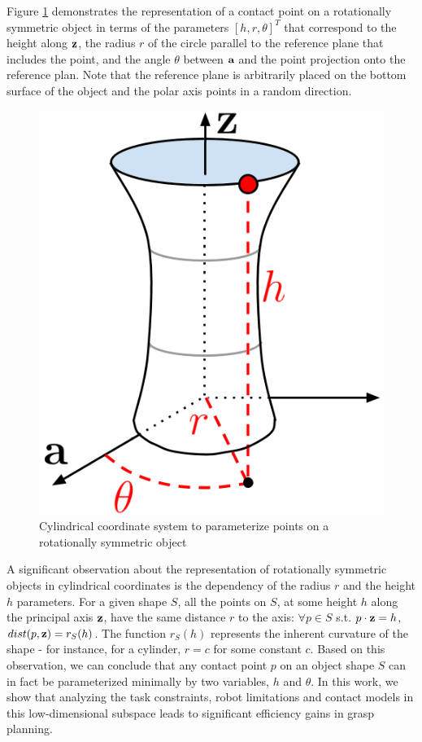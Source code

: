 \documentclass{aamas2015}
\begin{document}
Figure \ref{fig:representation} demonstrates the representation
of a contact point on a rotationally symmetric object in terms of the parameters $[h, r, \theta]^T$
that correspond to the height along $\textbf{z}$, the radius $r$ of the circle parallel to the
reference plane that includes the point, and the angle $\theta$ between $\textbf{a}$ and the point
projection onto the reference plan. Note that the reference plane is arbitrarily placed 
on the bottom surface of the object and the polar axis points in a random
direction. 

\begin{figure}[ht!]
  \begin{center}
    \includegraphics[width=0.75\linewidth]{./images/representation.png} \quad 
  \end{center}
  \caption{Cylindrical coordinate system to parameterize points on a rotationally symmetric object}
  \label{fig:representation}
\end{figure}

\newpage

A significant observation about the representation of rotationally symmetric objects in cylindrical
coordinates is the dependency of the radius $r$ and the height $h$ parameters. For a given shape $S$,
all the points on $S$, at some height $h$ along the principal axis $\textbf{z}$, have the same distance
$r$ to the axis: $\forall p \in S$ s.t. $p \cdot \textbf{z} = h$, $dist(p, \textbf{z}) = r_S(h)$. The
function $r_S(h)$ represents the inherent curvature of the shape - for instance, for a cylinder, $r
= c$ for some constant $c$. Based on this observation, we can conclude that any contact point $p$ on
an object shape $S$ can in fact be parameterized minimally by two variables, $h$ and $\theta$.
In this work, we show that analyzing the task constraints, robot limitations and contact models 
in this low-dimensional subspace leads to significant efficiency gains in grasp planning.
\end{document}
